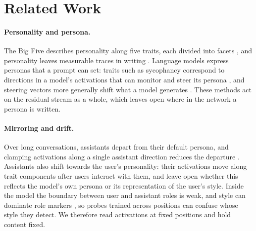 \section{Related Work}
\label{sec:related}

\paragraph{Personality and persona.}
The Big Five describes personality along five traits, each divided into facets \citep{soto2017next}, and personality leaves measurable traces in writing \citep{pennebaker1999linguistic, mairesse2007using}. Language models express personas that a prompt can set: traits such as sycophancy correspond to directions in a model's activations that can monitor and steer its persona \citep{chen2025persona}, and steering vectors more generally shift what a model generates \citep{subramani2022extracting}. These methods act on the residual stream as a whole, which leaves open where in the network a persona is written.

\paragraph{Mirroring and drift.}
Over long conversations, assistants depart from their default persona, and clamping activations along a single assistant direction reduces the departure \citep{lu2026assistant}. Assistants also shift towards the user's personality: their activations move along trait components after users interact with them, and \citet{sprejer2026white} leave open whether this reflects the model's own persona or its representation of the user's style. Inside the model the boundary between user and assistant roles is weak, and style can dominate role markers \citep{ye2026prompt}, so probes trained across positions can confuse whose style they detect. We therefore read activations at fixed positions and hold content fixed.

